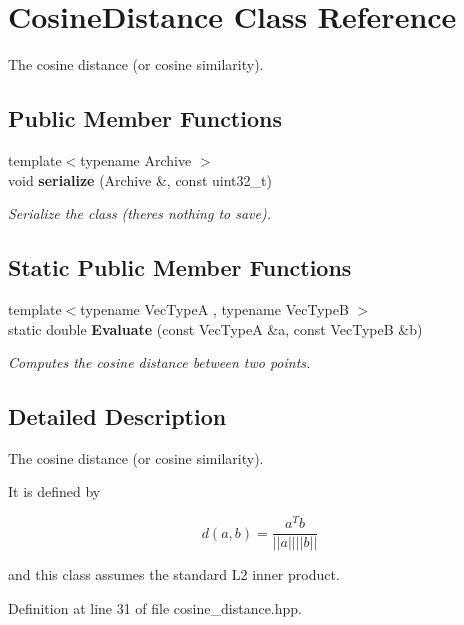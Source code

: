 \section{Cosine\+Distance Class Reference}
\label{classmlpack_1_1kernel_1_1CosineDistance}


The cosine distance (or cosine similarity).  


\subsection*{Public Member Functions}
\begin{DoxyCompactItemize}
\item 
{\footnotesize template$<$typename Archive $>$ }\\void \textbf{ serialize} (Archive \&, const uint32\+\_\+t)
\begin{DoxyCompactList}\small\item\em Serialize the class (there\textquotesingle{}s nothing to save). \end{DoxyCompactList}\end{DoxyCompactItemize}
\subsection*{Static Public Member Functions}
\begin{DoxyCompactItemize}
\item 
{\footnotesize template$<$typename Vec\+TypeA , typename Vec\+TypeB $>$ }\\static double \textbf{ Evaluate} (const Vec\+TypeA \&a, const Vec\+TypeB \&b)
\begin{DoxyCompactList}\small\item\em Computes the cosine distance between two points. \end{DoxyCompactList}\end{DoxyCompactItemize}


\subsection{Detailed Description}
The cosine distance (or cosine similarity). 

It is defined by

\[ d(a, b) = \frac{a^T b}{|| a || || b ||} \]

and this class assumes the standard L2 inner product. 

Definition at line 31 of file cosine\+\_\+distance.\+hpp.



